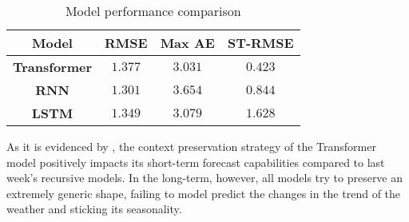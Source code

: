 \documentclass{scrartcl}
\begin{document}
    \begin{table}[ht]
      \centering
      \begin{tabular}{|c|c|c|c|}
        \hline
        \textbf{Model} & \textbf{RMSE} & \textbf{Max AE} & \textbf{ST-RMSE} \\ \hline
        \textbf{Transformer} & $1.377$ & $3.031$ & $0.423$ \\ \hline
        \textbf{RNN} & $1.301$ & $3.654$ & $0.844$ \\ \hline
        \textbf{LSTM} & $1.349$ & $3.079$ & $1.628$ \\ \hline
      \end{tabular}
      \caption{Model performance comparison}
      \label{tb:comparison}
    \end{table}

    As it is evidenced by , the context preservation strategy of the Transformer model positively impacts its short-term forecast capabilities compared to last week's recursive models. In the long-term, however, all models try to preserve an extremely generic shape, failing to model predict the changes in the trend of the weather and sticking its seasonality.

  \printbibliography
\end{document}
